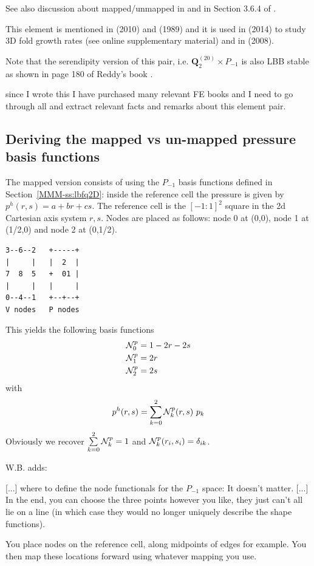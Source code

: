 See also discussion about mapped/unmapped in \textcite{bobf13} and 
in Section 3.6.4 of \textcite{john16}.

This element is mentioned in \textcite{kaus10} (2010) and \textcite{pefc89} (1989) 
and it is used in \textcite{freh14} (2014) to study 3D fold growth rates 
(see online supplementary material) and in \textcite{schm08} (2008).

Note that the serendipity version of this pair, 
i.e. ${\bm Q}_2^{(20)}\times P_{-1}$ is also LBB stable
as shown in page 180 of Reddy's book \cite{reddybook2}.

{\color{red} since I wrote this I have purchased many relevant FE books
and I need to go through all and extract relevant facts and remarks about 
this element pair.}


\subsection*{Deriving the mapped vs un-mapped pressure basis functions}


The mapped version consists of  
using the $P_{-1}$ basis functions defined in Section~\ref{MMM-ss:lbfq2D}:
inside the reference cell the pressure is given by $p^h(r,s)=a+br+cs$.
The reference cell is the $[-1:1]^2$ square in the 2d Cartesian axis
system $r,s$.
Nodes are placed as follows: node 0 at (0,0), node 1 at (1/2,0) and node 2 at (0,1/2).

\begin{verbatim}
3--6--2   +-----+
|     |   |  2  |
7  8  5   +  01 |
|     |   |     |
0--4--1   +--+--+
V nodes   P nodes
\end{verbatim}

This yields the following basis functions
\begin{align}
{\mathcal{N}}_0^p &= 1-2r-2s \nonumber\\
{\mathcal{N}}_1^p &= 2r \nonumber\\
{\mathcal{N}}_2^p &= 2s \nonumber
\end{align}
with 
\[
p^h(r,s) = \sum_{k=0}^2 {\mathcal{N}}_k^p(r,s) \ p_k
\]
Obviously we recover $\sum\limits_{k=0}^2 {\mathcal{N}}_k^p = 1$ and ${\mathcal{N}}_k^p(r_i,s_i)=\delta_{ik}$.

W.B. adds:
\begin{displayquote}
{\color{darkgray}
[...] where to define the node functionals for the $P_{-1}$ space: It doesn't
matter. [...] In the end, you can
choose the three points however you like, they just can't all lie on a line
(in which case they would no longer uniquely describe the shape functions).

You place nodes on the reference cell, along midpoints of edges for
example. You then map these locations forward using whatever mapping you use. 
}
\end{displayquote}

